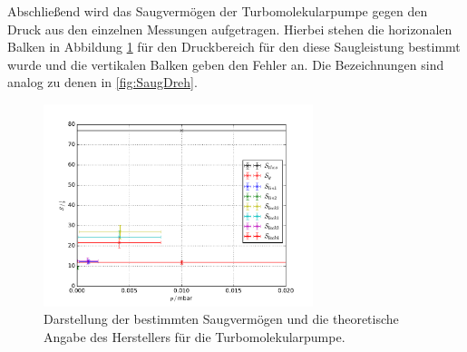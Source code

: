 Abschließend wird das Saugvermögen der Turbomolekularpumpe gegen den Druck aus den einzelnen Messungen aufgetragen. Hierbei
stehen die horizonalen Balken in Abbildung \ref{fig:SaugTurbo} für den Druckbereich für den diese Saugleistung bestimmt wurde
und die vertikalen Balken geben den Fehler an. Die Bezeichnungen sind analog zu denen in \ref{fig:SaugDreh}.
\begin{figure}[H]
  \centering
  \includegraphics[width=0.7\textwidth]{plots/SaugverTurbo.pdf}
  \caption{Darstellung der bestimmten Saugvermögen und die theoretische Angabe des Herstellers für die Turbomolekularpumpe.}
  \label{fig:SaugTurbo}
\end{figure}
